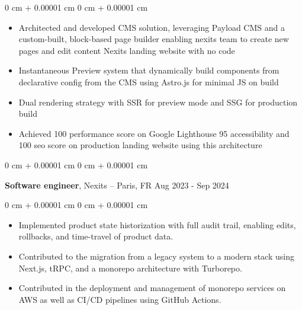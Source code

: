 \documentclass[10pt, letterpaper]{article}
\newenvironment{highlights}{
    \begin{itemize}[
        topsep=0.10 cm,
        parsep=0.10 cm,
        partopsep=0pt,
        itemsep=0pt,
        leftmargin=0 cm + 10pt
    ]
}{
    \end{itemize}
} %
\newenvironment{onecolentry}{
    \begin{adjustwidth}{
        0 cm + 0.00001 cm
    }{
        0 cm + 0.00001 cm
    }
}{
    \end{adjustwidth}
} %
\newenvironment{twocolentry}[2][]{
    \onecolentry
    \def\secondColumn{#2}
    \setcolumnwidth{\fill, 4.5 cm}
    \begin{paracol}{2}
}{
    \switchcolumn \raggedleft \secondColumn
    \end{paracol}
    \endonecolentry
} %
\begin{document}
        \vspace{0.10 cm}
        \begin{onecolentry}
            \begin{highlights}
                \item Architected and developed CMS solution,
     leveraging Payload CMS and a custom-built, block-based page builder enabling nexits team to create new pages and edit content Nexits landing website with no code
                \item 
                  Instantaneous Preview system that dynamically build components from declarative config from the CMS using Astro.js for minimal JS on build
                \item Dual rendering strategy with SSR for preview mode and SSG for production build
                \item Achieved 100 performance score on Google Lighthouse 95 accessibility and 100 seo score on production landing website using this architecture 
            \end{highlights}

        \end{onecolentry}

                \begin{twocolentry}{
            Aug 2023 - Sep 2024
        }
            \textbf{Software engineer}, Nexits  -- Paris, FR\end{twocolentry}

        \vspace{0.10 cm}
        \begin{onecolentry}
            \begin{highlights}

                \item Implemented product state historization with full audit trail, enabling edits, rollbacks, and time-travel of product data.

                \item Contributed to the migration from a legacy system to a modern stack using Next.js, tRPC, and a monorepo architecture with Turborepo.

                \item Contributed in the deployment and management of monorepo services on AWS as well as CI/CD pipelines using GitHub Actions.
                \end{highlights}

        \end{onecolentry}
\end{document}
